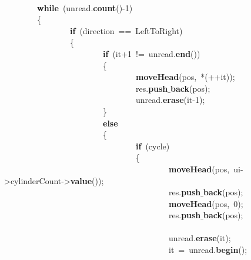 \mbox{} \\
\mbox{}\ \ \ \ \ \ \ \ \textbf{while}\ (unread.\textbf{count}()-1) \\
\mbox{}\ \ \ \ \ \ \ \ \{ \\
\mbox{}\ \ \ \ \ \ \ \ \ \ \ \ \ \ \ \ \textbf{if}\ (direction\ ==\ LeftToRight) \\
\mbox{}\ \ \ \ \ \ \ \ \ \ \ \ \ \ \ \ \{ \\
\mbox{}\ \ \ \ \ \ \ \ \ \ \ \ \ \ \ \ \ \ \ \ \ \ \ \ \textbf{if}\ (it+1\ !=\ unread.\textbf{end}()) \\
\mbox{}\ \ \ \ \ \ \ \ \ \ \ \ \ \ \ \ \ \ \ \ \ \ \ \ \{ \\
\mbox{}\ \ \ \ \ \ \ \ \ \ \ \ \ \ \ \ \ \ \ \ \ \ \ \ \ \ \ \ \ \ \ \ \textbf{moveHead}(pos,\ *(++it)); \\
\mbox{}\ \ \ \ \ \ \ \ \ \ \ \ \ \ \ \ \ \ \ \ \ \ \ \ \ \ \ \ \ \ \ \ res.\textbf{push$\_$back}(pos); \\
\mbox{}\ \ \ \ \ \ \ \ \ \ \ \ \ \ \ \ \ \ \ \ \ \ \ \ \ \ \ \ \ \ \ \ unread.\textbf{erase}(it-1); \\
\mbox{}\ \ \ \ \ \ \ \ \ \ \ \ \ \ \ \ \ \ \ \ \ \ \ \ \} \\
\mbox{}\ \ \ \ \ \ \ \ \ \ \ \ \ \ \ \ \ \ \ \ \ \ \ \ \textbf{else} \\
\mbox{}\ \ \ \ \ \ \ \ \ \ \ \ \ \ \ \ \ \ \ \ \ \ \ \ \{ \\
\mbox{}\ \ \ \ \ \ \ \ \ \ \ \ \ \ \ \ \ \ \ \ \ \ \ \ \ \ \ \ \ \ \ \ \textbf{if}\ (cycle) \\
\mbox{}\ \ \ \ \ \ \ \ \ \ \ \ \ \ \ \ \ \ \ \ \ \ \ \ \ \ \ \ \ \ \ \ \{ \\
\mbox{}\ \ \ \ \ \ \ \ \ \ \ \ \ \ \ \ \ \ \ \ \ \ \ \ \ \ \ \ \ \ \ \ \ \ \ \ \ \ \ \ \textbf{moveHead}(pos,\ ui-\textgreater{}cylinderCount-\textgreater{}\textbf{value}()); \\
\mbox{}\ \ \ \ \ \ \ \ \ \ \ \ \ \ \ \ \ \ \ \ \ \ \ \ \ \ \ \ \ \ \ \ \ \ \ \ \ \ \ \ res.\textbf{push$\_$back}(pos); \\
\mbox{}\ \ \ \ \ \ \ \ \ \ \ \ \ \ \ \ \ \ \ \ \ \ \ \ \ \ \ \ \ \ \ \ \ \ \ \ \ \ \ \ \textbf{moveHead}(pos,\ 0); \\
\mbox{}\ \ \ \ \ \ \ \ \ \ \ \ \ \ \ \ \ \ \ \ \ \ \ \ \ \ \ \ \ \ \ \ \ \ \ \ \ \ \ \ res.\textbf{push$\_$back}(pos); \\
\mbox{} \\
\mbox{}\ \ \ \ \ \ \ \ \ \ \ \ \ \ \ \ \ \ \ \ \ \ \ \ \ \ \ \ \ \ \ \ \ \ \ \ \ \ \ \ unread.\textbf{erase}(it); \\
\mbox{}\ \ \ \ \ \ \ \ \ \ \ \ \ \ \ \ \ \ \ \ \ \ \ \ \ \ \ \ \ \ \ \ \ \ \ \ \ \ \ \ it\ =\ unread.\textbf{begin}(); \\

